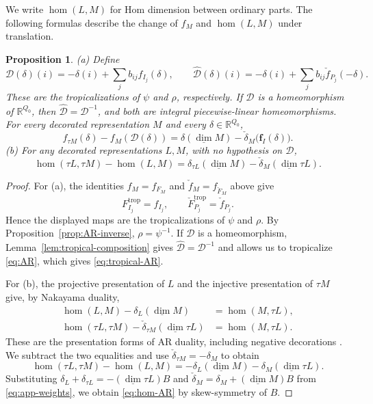 \documentclass[11pt]{amsart}
\numberwithin{equation}{section}
\newtheorem{proposition}[theorem]{Proposition}
\theoremstyle{definition}
\theoremstyle{remark}
\newcommand{\RR}{\mathbb R}
\newcommand{\dv}{\underline{\dim}}
\begin{document}
We write $\hom(L,M)$ for Hom dimension between ordinary
parts. The following formulas describe the change of $f_M$ and
$\hom(L,M)$ under translation.

\begin{proposition}\label{prop:AR-transformations}\label{cor:tropical-AR}\label{prop:hom-AR}
\textup{(a)} Define
\[ \mathcal D(\delta)(i)=-\delta(i)+\sum_jb_{ij}f_{I_j}(\delta),\qquad
\widehat{\mathcal D}(\delta)(i)=-\delta(i)+\sum_jb_{ij}\check f_{P_j}(-\delta). \]
These are the tropicalizations of $\psi$ and $\rho$, respectively.
If $\mathcal D$ is a homeomorphism of $\RR^{Q_0}$, then
$\widehat{\mathcal D}=\mathcal D^{-1}$, and both are integral
piecewise-linear homeomorphisms. For every decorated representation
$M$ and every $\delta\in\RR^{Q_0}$,
\begin{equation}\label{eq:tropical-AR} f_{\tau M}(\delta)-f_M(\mathcal D(\delta))=\delta(\dv M)-\check\delta_M\bigl(\mathbf f_I(\delta)\bigr).\end{equation}
\textup{(b)} For any decorated representations $L,M$, with no
hypothesis on $\mathcal D$,
\begin{equation}\label{eq:hom-AR} \hom(\tau L,\tau M)-\hom(L,M)=\delta_{\tau L}(\dv M)-\check\delta_M(\dv\tau L).\end{equation}
\end{proposition}

\begin{proof}
For (a), the identities $f_M=f_{F_M}$ and
$\check f_M=f_{\check F_M}$ above give
\[ F_{I_j}^{\mathrm{trop}}=f_{I_j},\qquad
\check F_{P_j}^{\mathrm{trop}}=\check f_{P_j}. \]
Hence the displayed maps are the tropicalizations of $\psi$ and $\rho$.
By Proposition~\ref{prop:AR-inverse}, $\rho=\psi^{-1}$. If $\mathcal D$
is a homeomorphism, Lemma~\ref{lem:tropical-composition}
gives $\widehat{\mathcal D}=\mathcal D^{-1}$ and allows us to tropicalize
\eqref{eq:AR}, which gives \eqref{eq:tropical-AR}.

For (b), the projective presentation of $L$ and the injective
presentation of $\tau M$ give, by Nakayama duality,
\[
\begin{aligned}
\hom(L,M)-\delta_L(\dv M)&=\hom(M,\tau L),\\
\hom(\tau L,\tau M)-\check\delta_{\tau M}(\dv\tau L)&=\hom(M,\tau L).
\end{aligned}
\]
These are the presentation forms of AR duality, including negative
decorations \cite[Lemma~2.3]{FeiT23}. We subtract the two equalities
and use $\check\delta_{\tau M}=-\delta_M$ to obtain
\[ \hom(\tau L,\tau M)-\hom(L,M)=-\delta_L(\dv M)-\delta_M(\dv\tau L). \]
Substituting $\delta_L+\delta_{\tau L}=-(\dv\tau L)B$ and
$\check\delta_M=\delta_M+(\dv M)B$ from \eqref{eq:app-weights},
we obtain \eqref{eq:hom-AR} by skew-symmetry of $B$.
\end{proof}
\end{document}
